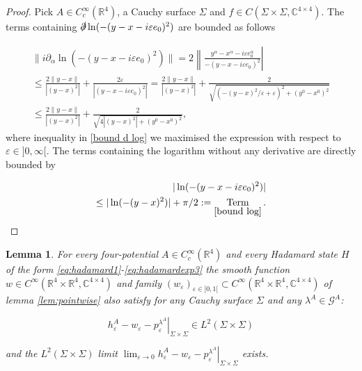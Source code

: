 \documentclass[a4paper,11pt]{article}
\newtheorem{lem}{Lemma}
\DeclareMathOperator{\term}{Term}
\begin{document}
\begin{proof}
Pick \(A\in C_c^\infty(\mathbb{R}^4)\), a Cauchy surface \(\Sigma\) and \(f\in C(\Sigma\times\Sigma,\mathbb{C}^{4\times 4})\).
The terms containing \(\slashed{\partial}\ln(-(y-x-i\varepsilon e_0)^2)\) are bounded as follows

\begin{align}
\|i\partial_\alpha\ln(-(y-x-i\varepsilon e_0)^2)\|=2\left\| \frac{y^\alpha-x^\alpha-i\varepsilon e_0^\alpha}{-(y-x-i\varepsilon e_0)^2}\right|\\
\le \frac{2\|y-x\|}{|(y-x)^2|} + \frac{2\varepsilon}{|(y-x-i\varepsilon e_0)^2|}
=\frac{2\|y-x\|}{|(y-x)^2|} + \frac{2}{\sqrt{(-(y-x)^2/\varepsilon + \varepsilon)^2 +(y^0-x^0)^2}}\\\label{bound d log}
\le \frac{2\|y-x\|}{|(y-x)^2|} + \frac{2}{\sqrt{4|(y-x)^2| + (y^0-x^0)^2}}, 
\end{align}
where inequality  in \eqref{bound d log} we maximised the expression with respect to \(\varepsilon \in ]0,\infty[\). 
The terms containing the logarithm without
any derivative are directly bounded by

\begin{align}\nonumber
|\ln(-(y-x-i\varepsilon e_0)^2)|&\\\label{bound log}\le |\ln(-(y-x)^2)| +\pi/2:=\term_{\eqref{bound log}}.
\end{align}
\end{proof}



\begin{lem}\label{lem:Hadamard=>Pol}
For every four-potential \(A\in C_c^\infty (\mathbb{R}^4)\) and every Hadamard
state \(H\) of the form \eqref{eq:hadamard1}-\eqref{eq:hadamardexp3} the  
smooth function \(w\in C^\infty(\mathbb{R}^4\times \mathbb{R}^4,\mathbb{C}^{4\times 4})\) and family 
\((w_\varepsilon)_{\varepsilon \in ]0,1[ }\subset C^\infty(\mathbb{R}^4\times \mathbb{R}^4,\mathbb{C}^{4\times4})\) of lemma \ref{lem:pointwise} also satisfy for any
 Cauchy surface \(\Sigma\) and any \(\lambda^A\in\mathcal{G}^A\):

\begin{equation}
\left.h_\varepsilon^A-w_\varepsilon-p^{\lambda^A}_\varepsilon \right|_{\Sigma\times\Sigma} \in L^2(\Sigma\times\Sigma)
\end{equation}

and the \(L^2(\Sigma\times\Sigma)\) limit \(\lim_{\varepsilon\rightarrow 0} \left.h_\varepsilon^A-w_\varepsilon-p^{\lambda^A}_\varepsilon \right|_{\Sigma\times\Sigma}\) exists.
\end{lem}
\end{document}
